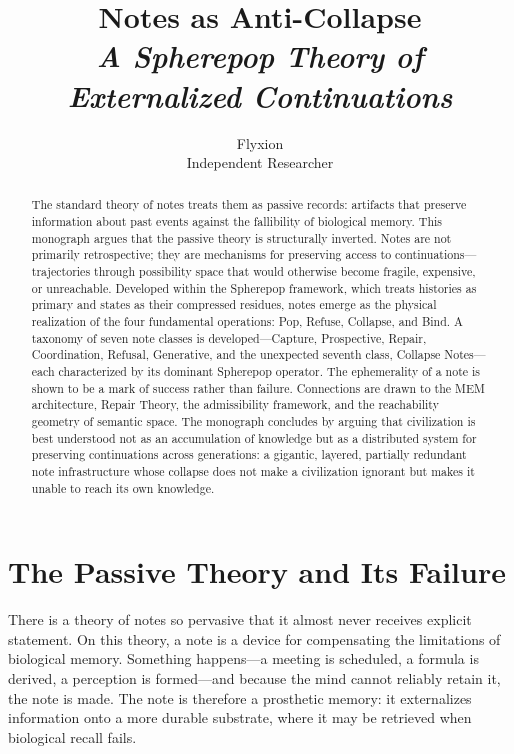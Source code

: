\documentclass[12pt, a4paper]{article}
\title{\textbf{Notes as Anti-Collapse}\\[0.5em]
\large\textit{A Spherepop Theory of Externalized Continuations}}
\author{Flyxion\\[0.3em]\small Independent Researcher}
\date{}
\theoremstyle{plain}
\theoremstyle{definition}
\theoremstyle{remark}
\begin{document}
\maketitle
\thispagestyle{empty}

\begin{abstract}
\noindent
The standard theory of notes treats them as passive records: artifacts that
preserve information about past events against the fallibility of biological
memory. This monograph argues that the passive theory is structurally inverted.
Notes are not primarily retrospective; they are mechanisms for preserving access
to continuations---trajectories through possibility space that would otherwise
become fragile, expensive, or unreachable. Developed within the Spherepop
framework, which treats histories as primary and states as their compressed
residues, notes emerge as the physical realization of the four fundamental
operations: Pop, Refuse, Collapse, and Bind. A taxonomy of seven note classes is
developed---Capture, Prospective, Repair, Coordination, Refusal, Generative, and
the unexpected seventh class, Collapse Notes---each characterized by its dominant
Spherepop operator. The ephemerality of a note is shown to be a mark of success
rather than failure. Connections are drawn to the MEM architecture, Repair
Theory, the admissibility framework, and the reachability geometry of semantic
space. The monograph concludes by arguing that civilization is best understood not
as an accumulation of knowledge but as a distributed system for preserving
continuations across generations: a gigantic, layered, partially redundant
note infrastructure whose collapse does not make a civilization ignorant but makes
it unable to reach its own knowledge.
\end{abstract}

\newpage

\tableofcontents

\newpage

\section{The Passive Theory and Its Failure}

There is a theory of notes so pervasive that it almost never receives explicit
statement. On this theory, a note is a device for compensating the limitations of
biological memory. Something happens---a meeting is scheduled, a formula is
derived, a perception is formed---and because the mind cannot reliably retain it,
the note is made. The note is therefore a prosthetic memory: it externalizes
information onto a more durable substrate, where it may be retrieved when
biological recall fails.
\end{document}
